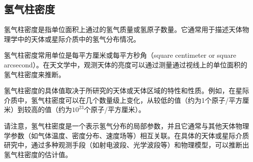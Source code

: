 \documentclass[12pt, a4paper, oneside]{ctexart}
\begin{document}
\begin{spacing}{2.0}
\section{氢气柱密度}

氢气柱密度是指单位面积上通过的氢气质量或氢原子数量。它通常用于描述天体物理学中的天体或星际介质中的氢气分布情况。

氢气柱密度常用单位是每平方厘米或每平方秒角（square centimeter or square arcsecond）。在天文学中，观测天体的亮度可以通过测量通过视线上的单位面积的氢气柱密度来推断。

氢气柱密度的具体值取决于所研究的天体或天体区域的特性和性质。例如，在星际介质中，氢气柱密度可以在几个数量级上变化，从较低的值（约为1个原子/平方厘米）到较高的值（约为$10^23$个原子/平方厘米）。

请注意，氢气柱密度是一个表示氢气分布的局部参数，并且它通常与其他天体物理学参数（如气体温度、密度分布、速度场等）相互关联。在具体的天体或星际介质研究中，通过多种观测手段（如射电波段、光学波段等）和物理模型，可以推断出氢气柱密度的估计值。






\end{spacing}{}
\end{document}
